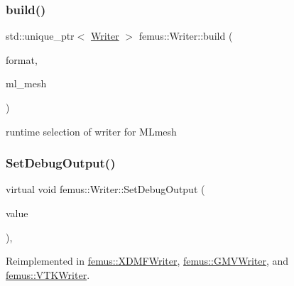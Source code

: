 \subsubsection{\texorpdfstring{build()}{build()}\hspace{0.1cm}{\footnotesize\ttfamily [2/2]}}
{\footnotesize\ttfamily std\+::unique\+\_\+ptr$<$ \mbox{\hyperlink{classfemus_1_1_writer}{Writer}} $>$ femus\+::\+Writer\+::build (\begin{DoxyParamCaption}\item[{const \mbox{\hyperlink{_writer_enum_8hpp_a18b827c3c1f62b8a57febdcad0c871a8}{Writer\+Enum}}}]{format,  }\item[{\mbox{\hyperlink{classfemus_1_1_multi_level_mesh}{Multi\+Level\+Mesh}} $\ast$}]{ml\+\_\+mesh }\end{DoxyParamCaption})\hspace{0.3cm}{\ttfamily [static]}}

runtime selection of writer for M\+Lmesh \mbox{\label{classfemus_1_1_writer_a17a6789b58e05989d74698904346f699}} 
\subsubsection{\texorpdfstring{Set\+Debug\+Output()}{SetDebugOutput()}}
{\footnotesize\ttfamily virtual void femus\+::\+Writer\+::\+Set\+Debug\+Output (\begin{DoxyParamCaption}\item[{bool}]{value }\end{DoxyParamCaption})\hspace{0.3cm}{\ttfamily [inline]}, {\ttfamily [virtual]}}



Reimplemented in \mbox{\hyperlink{classfemus_1_1_x_d_m_f_writer_a4c69012d7952e8ac011b876a516d073b}{femus\+::\+X\+D\+M\+F\+Writer}}, \mbox{\hyperlink{classfemus_1_1_g_m_v_writer_a80134094abcb8d2766414841d86038a9}{femus\+::\+G\+M\+V\+Writer}}, and \mbox{\hyperlink{classfemus_1_1_v_t_k_writer_af6eea80a3b7348bf2066c1150ead1bc8}{femus\+::\+V\+T\+K\+Writer}}.

\mbox{\label{classfemus_1_1_writer_adc8bd9b254a8766a5073624c75b0f649}} 
